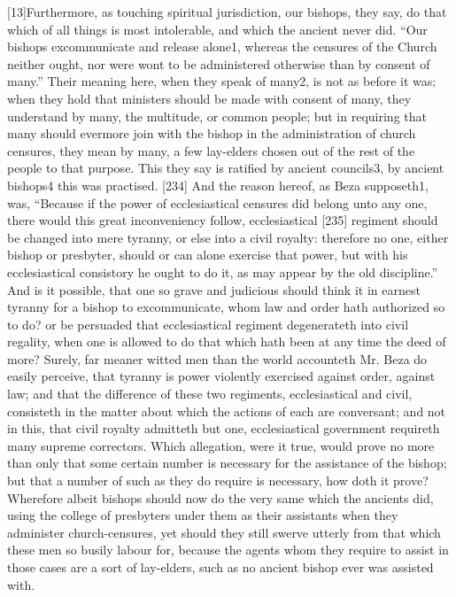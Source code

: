 [13]Furthermore, as touching spiritual jurisdiction, our bishops, they say, do that which of all things is most intolerable, and which the ancient never did. “Our bishops excommunicate and release alone1, whereas the censures of the Church neither ought, nor were wont to be administered otherwise than by consent of many.” Their meaning here, when they speak of many2, is not as before it was; when they hold that ministers should be made with consent of many, they understand by many, the multitude, or common people; but in requiring that many should evermore join with the bishop in the administration of church censures, they mean by many, a few lay-elders chosen out of the rest of the people to that purpose. This they say is ratified by ancient councils3, by ancient bishops4 this was practised. [234] And the reason hereof, as Beza supposeth1, was, “Because if the power of ecclesiastical censures did belong unto any one, there would this great inconveniency follow, ecclesiastical [235] regiment should be changed into mere tyranny, or else into a civil royalty: therefore no one, either bishop or presbyter, should or can alone exercise that power, but with his ecclesiastical consistory he ought to do it, as may appear by the old discipline.” And is it possible, that one so grave and judicious should think it in earnest tyranny for a bishop to excommunicate, whom law and order hath authorized so to do? or be persuaded that ecclesiastical regiment degenerateth into civil regality, when one is allowed to do that which hath been at any time the deed of more? Surely, far meaner witted men than the world accounteth Mr. Beza do easily perceive, that tyranny is power violently exercised against order, against law; and that the difference of these two regiments, ecclesiastical and civil, consisteth in the matter about which the actions of each are conversant; and not in this, that civil royalty admitteth but one, ecclesiastical government requireth many supreme correctors. Which allegation, were it true, would prove no more than only that some certain number is necessary for the assistance of the bishop; but that a number of such as they do require is necessary, how doth it prove? Wherefore albeit bishops should now do the very same which the ancients did, using the college of presbyters under them as their assistants when they administer church-censures, yet should they still swerve utterly from that which these men so busily labour for, because the agents whom they require to assist in those cases are a sort of lay-elders, such as no ancient bishop ever was assisted with.

